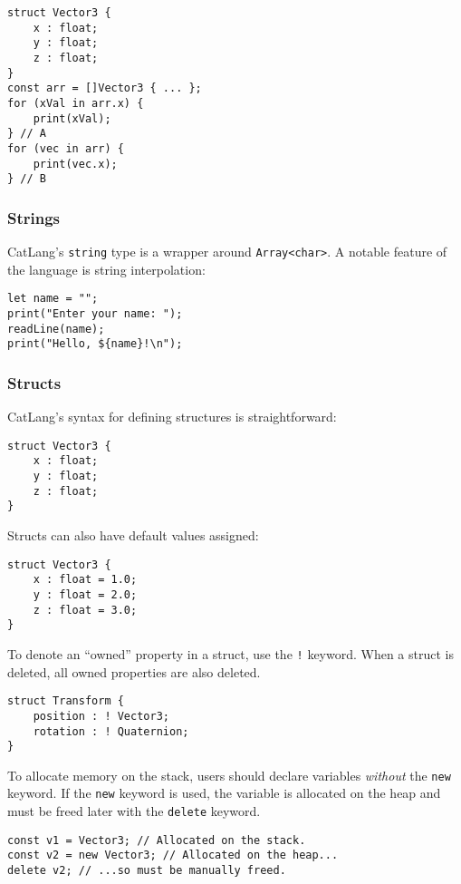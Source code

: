 \documentclass[12pt]{article}
\begin{document}
\begin{lstlisting}
struct Vector3 {
	x : float;
	y : float;
	z : float;
}
const arr = []Vector3 { ... };
for (xVal in arr.x) {
	print(xVal);
} // A
for (vec in arr) {
	print(vec.x);
} // B
\end{lstlisting}

\subsubsection{Strings}

CatLang's \lstinline!string! type is a wrapper around \lstinline!Array<char>!. A notable feature of the language is string interpolation:

\begin{lstlisting}
let name = "";
print("Enter your name: ");
readLine(name);
print("Hello, ${name}!\n");
\end{lstlisting}

\subsubsection{Structs}

CatLang's syntax for defining structures is straightforward:

\begin{lstlisting}
struct Vector3 {
	x : float;
	y : float;
	z : float;
}
\end{lstlisting}

Structs can also have default values assigned:

\begin{lstlisting}
struct Vector3 {
	x : float = 1.0;
	y : float = 2.0;
	z : float = 3.0;
}
\end{lstlisting}

To denote an ``owned'' property in a struct, use the \lstinline$!$ keyword. When a struct is deleted, all owned properties are also deleted.

\begin{lstlisting}
struct Transform {
	position : ! Vector3;
	rotation : ! Quaternion;
}
\end{lstlisting}

To allocate memory on the stack, users should declare variables \emph{without} the \lstinline!new! keyword. If the \lstinline!new! keyword is used, the variable is allocated on the heap and must be freed later with the \lstinline!delete! keyword.

\begin{lstlisting}
const v1 = Vector3; // Allocated on the stack.
const v2 = new Vector3; // Allocated on the heap...
delete v2; // ...so must be manually freed.
\end{lstlisting}
\end{document}
